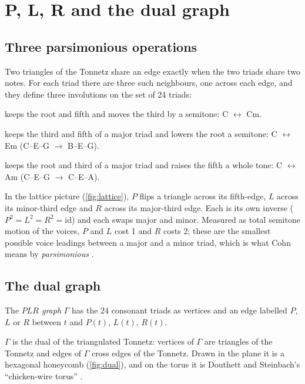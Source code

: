 \chapter{P, L, R and the dual graph}\label{ch:plr}

\section{Three parsimonious operations}
Two triangles of the Tonnetz share an edge exactly when the two triads share two notes. For each triad there are
three such neighbours, one across each edge, and they define three involutions on the set of 24 triads:
\begin{description}[leftmargin=1.2em]
\item[$P$ (parallel)] keeps the root and fifth and moves the third by a semitone: C $\leftrightarrow$ Cm.
\item[$L$ (leading-tone exchange)] keeps the third and fifth of a major triad and lowers the root a semitone:
C $\leftrightarrow$ Em (C--E--G $\to$ B--E--G).
\item[$R$ (relative)] keeps the root and third of a major triad and raises the fifth a whole tone:
C $\leftrightarrow$ Am (C--E--G $\to$ C--E--A).
\end{description}
In the lattice picture (\cref{fig:lattice}), $P$ flips a triangle across its fifth-edge, $L$ across its
minor-third edge and $R$ across its major-third edge. Each is its own inverse ($P^2=L^2=R^2=\mathrm{id}$) and each
swaps major and minor. Measured as total semitone motion of the voices, $P$ and $L$ cost 1 and $R$ costs 2; these
are the smallest possible voice leadings between a major and a minor triad, which is what Cohn means by
\emph{parsimonious} \citep{cohn1997}.

\section{The dual graph}
\begin{definition}
The \emph{$PLR$ graph} $\Gamma$ has the 24 consonant triads as vertices and an edge labelled $P$, $L$ or $R$ between
$t$ and $P(t)$, $L(t)$, $R(t)$.
\end{definition}
$\Gamma$ is the dual of the triangulated Tonnetz: vertices of $\Gamma$ are triangles of the Tonnetz and edges of $\Gamma$
cross edges of the Tonnetz. Drawn in the plane it is a hexagonal honeycomb (\cref{fig:dual}), and on the torus it
is Douthett and Steinbach's ``chicken-wire torus'' \citep{douthett1998}.

